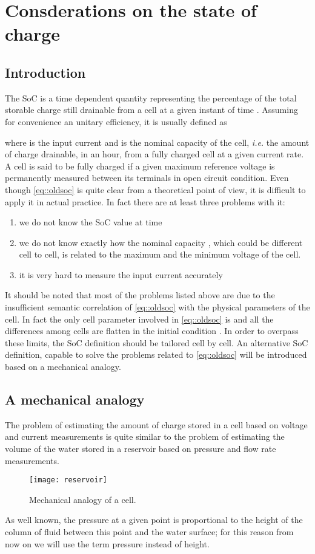 \documentclass[journal]{IEEEtran}
\begin{document}
\section{Consderations on the state of charge}
\label{sec::soc}
\subsection{Introduction}
The SoC is a time dependent quantity representing the percentage of the total storable charge still drainable from a cell at a given instant of time \cite{Zou_2014}. Assuming for convenience an unitary efficiency, it is usually defined as

where  is the input current and  is the nominal capacity of the cell, \textit{i.e.} the  amount of charge drainable, in an hour, from a fully charged cell at a given current rate. A cell is said to be fully charged if a given maximum reference voltage is permanently measured between its terminals in open circuit condition.
Even though \eqref{eq::oldsoc} is quite clear from a theoretical point of view, it is difficult to apply it in actual practice. In fact there are at least three problems with it:
\begin{enumerate}
\item we do not know the SoC value  at time 
\item we do not know exactly how the nominal capacity , which could be different cell to cell, is related to the maximum and the minimum voltage of the cell.
\item it is very hard to measure the input current  accurately 
\end{enumerate}
It should be noted that most of the problems listed above are due to the insufficient semantic correlation of \eqref{eq::oldsoc} with the physical parameters of the cell. In fact the only cell parameter involved in \eqref{eq::oldsoc} is  and all the differences among cells are flatten in the initial condition .
In order to overpass these limits, the SoC definition should be tailored cell by cell.
An alternative SoC definition, capable to solve the problems related to \eqref{eq::oldsoc} will be introduced based on a mechanical analogy.
\subsection{A mechanical analogy}
\label{sec::analogy}
The problem of estimating the amount of charge stored in a cell based on voltage and current measurements is quite similar to the problem of estimating the volume of the water stored in a reservoir based on pressure and flow rate measurements.
\begin{figure}[!htbp]
	\centering
		\texttt{[image: reservoir]}
	\caption{Mechanical analogy of a cell.}
	\label{fig::reservoir}
\end{figure}
As well known, the pressure at a given point is proportional to the height of the column of fluid between this point and the water surface; for this reason from now on we will use the term pressure instead of height. 
\end{document}
